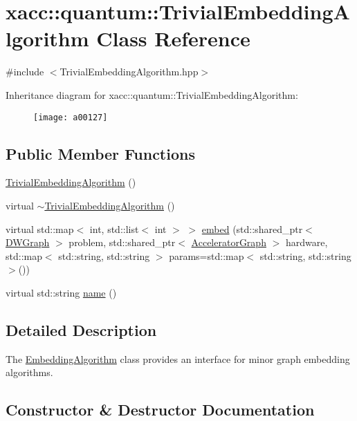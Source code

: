 \hypertarget{a00127}{}\section{xacc\+:\+:quantum\+:\+:Trivial\+Embedding\+Algorithm Class Reference}
\label{a00127}


{\ttfamily \#include $<$Trivial\+Embedding\+Algorithm.\+hpp$>$}

Inheritance diagram for xacc\+:\+:quantum\+:\+:Trivial\+Embedding\+Algorithm\+:\begin{figure}[H]
\begin{center}
\leavevmode
\texttt{[image: a00127]}
\end{center}
\end{figure}
\subsection*{Public Member Functions}
\begin{DoxyCompactItemize}
\item 
\hyperlink{a00127_aa704a3dc5825db1b023c54d84ec0f883}{Trivial\+Embedding\+Algorithm} ()
\item 
virtual \hyperlink{a00127_a692614cae332c77ae46e059b66d6f79c}{$\sim$\+Trivial\+Embedding\+Algorithm} ()
\item 
virtual std\+::map$<$ int, std\+::list$<$ int $>$ $>$ \hyperlink{a00127_a09e162a745528ffa3ea847dd5afee45b}{embed} (std\+::shared\+\_\+ptr$<$ \hyperlink{a00043}{D\+W\+Graph} $>$ problem, std\+::shared\+\_\+ptr$<$ \hyperlink{a00064}{Accelerator\+Graph} $>$ hardware, std\+::map$<$ std\+::string, std\+::string $>$ params=std\+::map$<$ std\+::string, std\+::string $>$())
\item 
virtual std\+::string \hyperlink{a00127_a5d3e8c56b53cda9c682dedc534bf38fb}{name} ()
\end{DoxyCompactItemize}


\subsection{Detailed Description}
The \hyperlink{a00052}{Embedding\+Algorithm} class provides an interface for minor graph embedding algorithms. 

\subsection{Constructor \& Destructor Documentation}
